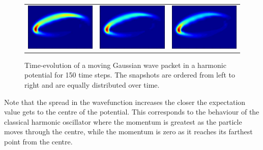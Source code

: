 \begin{figure}[H]
\begin{tabular}{ccc}
  \includegraphics[scale = 0.29]{QHO13.png} &   \includegraphics[scale = 0.29]{QHO14.png}   &   \includegraphics[scale = 0.29]{QHO15.png} \\
\end{tabular}
\caption{Time-evolution of a moving Gaussian wave packet in a harmonic potential for 150 time steps. The snapshots are ordered from left to right and are equally distributed over time.}
\label{fig:QHO}
\end{figure} Note that the spread in the wavefunction increases the closer the expectation value gets to the centre of the potential. This corresponds to the behaviour of the classical harmonic oscillator where the momentum is greatest as the particle moves through the centre, while the momentum is zero as it reaches its farthest point from the centre.

